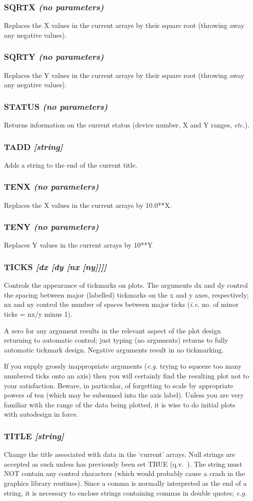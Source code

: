 \documentclass[twoside,11pt,noabs,nolof]{starlink}
\providecommand{\dipcom}[3]{\subsubsection*{\label{COM:#1}\textbf{#1} \emph{#2}}}
\begin{document}
\dipcom{SQRTX}{(no parameters)}{Takes the square root of the X values in the current arrays}
Replaces the X values in the current arrays by their square root
(throwing away any negative values).

\dipcom{SQRTY}{(no parameters)}{Takes the square root of the Y values in the current arrays}
Replaces the Y values in the current arrays by their square root
(throwing away any negative values).

\dipcom{STATUS}{(no parameters)}{Displays the current device, X and Y ranges, etc}
Returns information on the current status (device number, X and Y
ranges, \emph{etc.}).

\dipcom{TADD}{[string]}{Adds a string to the end of the current title}
Adds a string to the end of the current title.

\dipcom{TENX}{(no parameters)}{Replaces the current array's X values by 10**X}
Replaces the X values in the current arrays by 10.0**X.

\dipcom{TENY}{(no parameters)}{Replaces the current array's Y values by 10**Y}
Replaces Y values in the current arrays by 10**Y

\dipcom{TICKS}{[dx [dy [nx [ny]]]]}{Controls the appearance of tick marks}
Controls the appearance of tickmarks on plots. The arguments dx and dy
control the spacing between major (labelled) tickmarks on the x and y
axes, respectively; nx and ny control the number of spaces between
major ticks (\emph{i.e.} no. of minor ticks = nx/y minus 1).

A zero for any argument results in the relevant aspect of the plot
design returning to automatic control; just typing   (no
arguments) returns to fully automatic tickmark design. Negative
arguments result in no tickmarking.

If you supply grossly inappropriate arguments (\emph{e.g.} trying to
squeeze too many numbered ticks onto an axis) then you will certainly
find the resulting plot not to your satisfaction. Beware, in
particular, of forgetting to scale by appropriate powers of ten (which
may be subsumed into the axis label). Unless you are very familiar
with the range of the data being plotted, it is wise to do initial
plots with autodesign in force.

\dipcom{TITLE}{[string]}{Changes the title stored with the current arrays}
Change the title associated with data in the `current' arrays. Null
strings are accepted as such unless   has previously been set
TRUE (q.v.\ ).  The string must NOT contain any control
characters (which would probably cause a crash in the graphics library
routines). Since a comma is normally interpreted as the end of a
string, it is necessary to enclose strings containing commas in double
quotes; \emph{e.g.}
\end{document}
